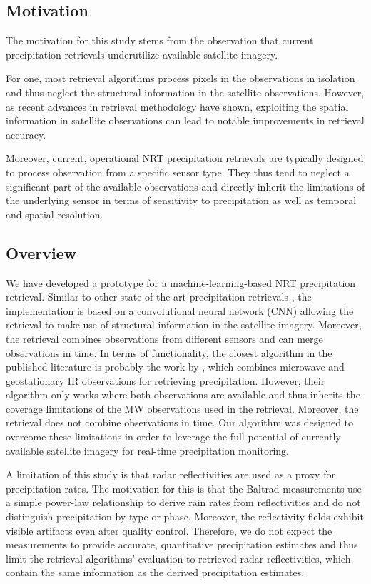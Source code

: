 \documentclass[11pt]{scrartcl}
\begin{document}
\subsection{Motivation}
\label{sec:orga93baac}


The motivation for this study stems from the observation that current
precipitation retrievals underutilize available satellite imagery.

For one, most retrieval algorithms process pixels in the observations in
isolation and thus neglect the structural information in the satellite
observations. However, as recent advances in retrieval methodology
\citep{pfreundschuh22} have shown, exploiting the spatial information in
satellite observations can lead to notable improvements in retrieval accuracy.

Moreover, current, operational NRT precipitation retrievals are typically
designed to process observation from a specific sensor type. They thus tend to
neglect a significant part of the available observations and directly inherit
the limitations of the underlying sensor in terms of sensitivity to
precipitation as well as temporal and spatial resolution.

\subsection{Overview}
\label{sec:org073dc78}


We have developed a prototype for a machine-learning-based NRT precipitation
retrieval. Similar to other state-of-the-art precipitation retrievals
\citep{pfreundschuh22, pfreundschuh22a}, the implementation is based on a
convolutional neural network (CNN) allowing the retrieval to make use of
structural information in the satellite imagery. Moreover, the retrieval
combines observations from different sensors and can merge observations in time.
In terms of functionality, the closest algorithm in the published literature is
probably the work by \citet{gorooh22}, which combines microwave and
geostationary IR observations for retrieving precipitation. However, their
algorithm only works where both observations are available and thus inherits the
coverage limitations of the MW observations used in the retrieval. Moreover, the
retrieval does not combine observations in time. Our algorithm was designed to
overcome these limitations in order to leverage the full potential of currently
available satellite imagery for real-time precipitation monitoring.

A limitation of this study is that radar reflectivities are used as a proxy for
precipitation rates. The motivation for this is that the Baltrad measurements
use a simple power-law relationship to derive rain rates from reflectivities and
do not distinguish precipitation by type or phase. Moreover, the reflectivity
fields exhibit visible artifacts even after quality control. Therefore, we do
not expect the measurements to provide accurate, quantitative precipitation
estimates and thus limit the retrieval algorithms' evaluation to retrieved radar
reflectivities, which contain the same information as the derived precipitation
estimates.
\end{document}
